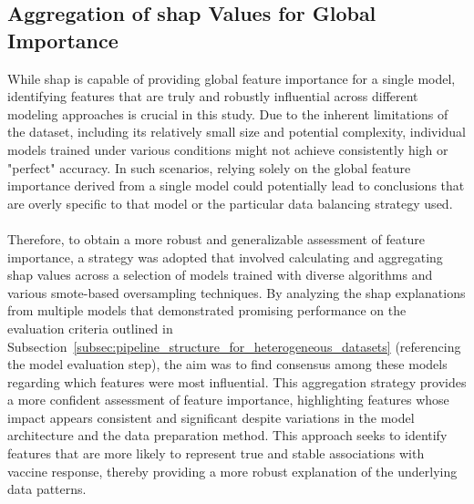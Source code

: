 \documentclass[12pt,a4paper]{report}
\newcommand{\todo}[1]{%
  \par\noindent%
  \begin{tcolorbox}[colback=yellow, colframe=black, boxrule=0.5pt, sharp corners, width=\linewidth, before skip=5pt, after skip=5pt]
    \textbf{TODO:} #1
  \end{tcolorbox}%
  \par
}
\begin{document}
\subsection{Aggregation of \gls{shap} Values for Global Importance}
While \gls{shap} is capable of providing global feature importance for a single model, identifying features that are truly and robustly influential across different modeling approaches is crucial in this study. Due to the inherent limitations of the dataset, including its relatively small size and potential complexity, individual models trained under various conditions might not achieve consistently high or "perfect" accuracy. In such scenarios, relying solely on the global feature importance derived from a single model could potentially lead to conclusions that are overly specific to that model or the particular data balancing strategy used.\\
\\
Therefore, to obtain a more robust and generalizable assessment of feature importance, a strategy was adopted that involved calculating and aggregating \gls{shap} values across a selection of models trained with diverse algorithms and various \gls{smote}-based oversampling techniques. By analyzing the \gls{shap} explanations from multiple models that demonstrated promising performance on the evaluation criteria outlined in Subsection~\ref{subsec:pipeline_structure_for_heterogeneous_datasets} (referencing the model evaluation step), the aim was to find consensus among these models regarding which features were most influential. This aggregation strategy provides a more confident assessment of feature importance, highlighting features whose impact appears consistent and significant despite variations in the model architecture and the data preparation method. This approach seeks to identify features that are more likely to represent true and stable associations with vaccine response, thereby providing a more robust explanation of the underlying data patterns.\\
\end{document}
